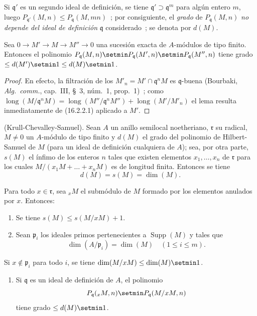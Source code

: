 Si $\mathfrak{q}'$ es un segundo ideal de definición, se tiene
$\mathfrak{q}'\supset\mathfrak{q}^m$ para algún entero $m$, luego
$P_{\mathfrak{q}'}(M,n)\leq P_{\mathfrak{q}}(M,mn)$~; por consiguiente, el
\emph{grado} de $P_{\mathfrak{q}}(M,n)$ \emph{no depende del ideal de definición}
$\mathfrak{q}$ considerado~; se denota por $d(M)$.

\begin{lemma}[16.2.2.2]
\label{0.16.2.2.2-fr}
Sea $0\to M'\to M\to M''\to0$ una sucesión exacta de $A$-módulos de tipo
finito. Entonces el polinomio
$P_{\mathfrak{q}}(M,n)\setmin P_{\mathfrak{q}}(M',n)\setmin P_{\mathfrak{q}}(M'',n)$
tiene grado $\leq d(M')\setmin 1\leq d(M)\setmin 1$.
\end{lemma}

\begin{proof}
En efecto, la filtración de los
$M'_n=M'\cap\mathfrak{q}^nM$ es $\mathfrak{q}$-buena (Bourbaki,
\emph{Alg.~comm.}, cap.~III, \S~3, núm.~1, prop.~1)~; como
$\operatorname{long}(M/\mathfrak{q}^nM)=\operatorname{long}(M''/\mathfrak{q}^nM'')+\operatorname{long}(M'/M'_n)$
el lema resulta inmediatamente de (16.2.2.1) aplicado a $M'$.
\end{proof}

\begin{theorem}[16.2.3]
\label{0.16.2.3-fr}
\textup{(Krull-Chevalley-Samuel).}
Sean $A$ un anillo semilocal noetheriano, $\mathfrak{r}$ su radical,
$M\neq0$ un $A$-módulo de tipo finito y $d(M)$ el grado del polinomio de
Hilbert-Samuel de $M$ (para un ideal de definición cualquiera de $A$); sea,
por otra parte, $s(M)$ el ínfimo de los enteros $n$ tales que existen elementos
$x_1,\ldots,x_n$ de $\mathfrak{r}$ para los cuales
$M/(x_1M+\ldots+x_nM)$ es de longitud finita. Entonces se tiene
\[
  d(M)=s(M)=\dim(M).
\]
\end{theorem}

\begin{lemma}[16.2.3.1]
\label{0.16.2.3.1-fr}
Para todo $x\in\mathfrak{r}$, sea ${}_xM$ el submódulo de $M$ formado por los
elementos anulados por $x$. Entonces:
\begin{enumerate}
  \item[\rm{(i)}] Se tiene $s(M)\leq s(M/xM)+1$.
  \item[\rm{(ii)}] Sean $\mathfrak{p}_i$ los ideales primos pertenecientes a
  $\operatorname{Supp}(M)$ y tales que
  \[
    \dim(A/\mathfrak{p}_i)=\dim(M)\quad(1\leq i\leq m).
  \]
\end{enumerate}
Si $x\notin\mathfrak{p}_i$ para todo $i$, se tiene
$\dim(M/xM)\leq\dim(M)\setmin 1$.
\begin{enumerate}
  \item[\rm{(iii)}] Si $\mathfrak{q}$ es un ideal de definición de $A$, el
  polinomio
  \[
    P_{\mathfrak{q}}({}_xM,n)\setmin P_{\mathfrak{q}}(M/xM,n)
  \]
  tiene grado $\leq d(M)\setmin 1$.
\end{enumerate}
\end{lemma}

